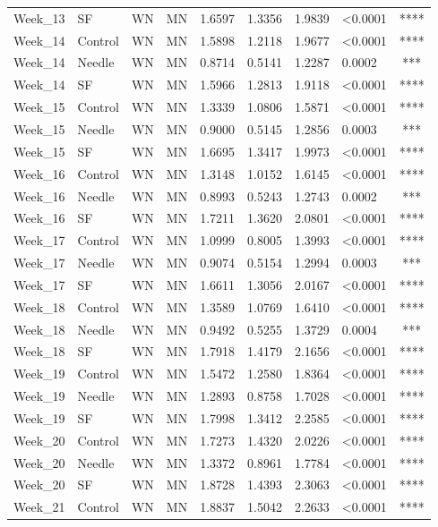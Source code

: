 \documentclass[
  12pt,
  letterpaper,
]{article}
\begin{document}
\begin{longtable}{llccrrrlc}
Week\_13 & SF & WN & MN & 1.6597 & 1.3356 & 1.9839 & <0.0001 & **** \\ 
Week\_14 & Control & WN & MN & 1.5898 & 1.2118 & 1.9677 & <0.0001 & **** \\ 
Week\_14 & Needle & WN & MN & 0.8714 & 0.5141 & 1.2287 & 0.0002 & *** \\ 
Week\_14 & SF & WN & MN & 1.5966 & 1.2813 & 1.9118 & <0.0001 & **** \\ 
Week\_15 & Control & WN & MN & 1.3339 & 1.0806 & 1.5871 & <0.0001 & **** \\ 
Week\_15 & Needle & WN & MN & 0.9000 & 0.5145 & 1.2856 & 0.0003 & *** \\ 
Week\_15 & SF & WN & MN & 1.6695 & 1.3417 & 1.9973 & <0.0001 & **** \\ 
Week\_16 & Control & WN & MN & 1.3148 & 1.0152 & 1.6145 & <0.0001 & **** \\ 
Week\_16 & Needle & WN & MN & 0.8993 & 0.5243 & 1.2743 & 0.0002 & *** \\ 
Week\_16 & SF & WN & MN & 1.7211 & 1.3620 & 2.0801 & <0.0001 & **** \\ 
Week\_17 & Control & WN & MN & 1.0999 & 0.8005 & 1.3993 & <0.0001 & **** \\ 
Week\_17 & Needle & WN & MN & 0.9074 & 0.5154 & 1.2994 & 0.0003 & *** \\ 
Week\_17 & SF & WN & MN & 1.6611 & 1.3056 & 2.0167 & <0.0001 & **** \\ 
Week\_18 & Control & WN & MN & 1.3589 & 1.0769 & 1.6410 & <0.0001 & **** \\ 
Week\_18 & Needle & WN & MN & 0.9492 & 0.5255 & 1.3729 & 0.0004 & *** \\ 
Week\_18 & SF & WN & MN & 1.7918 & 1.4179 & 2.1656 & <0.0001 & **** \\ 
Week\_19 & Control & WN & MN & 1.5472 & 1.2580 & 1.8364 & <0.0001 & **** \\ 
Week\_19 & Needle & WN & MN & 1.2893 & 0.8758 & 1.7028 & <0.0001 & **** \\ 
Week\_19 & SF & WN & MN & 1.7998 & 1.3412 & 2.2585 & <0.0001 & **** \\ 
Week\_20 & Control & WN & MN & 1.7273 & 1.4320 & 2.0226 & <0.0001 & **** \\ 
Week\_20 & Needle & WN & MN & 1.3372 & 0.8961 & 1.7784 & <0.0001 & **** \\ 
Week\_20 & SF & WN & MN & 1.8728 & 1.4393 & 2.3063 & <0.0001 & **** \\ 
Week\_21 & Control & WN & MN & 1.8837 & 1.5042 & 2.2633 & <0.0001 & **** \\ 

\end{longtable}
\end{document}
